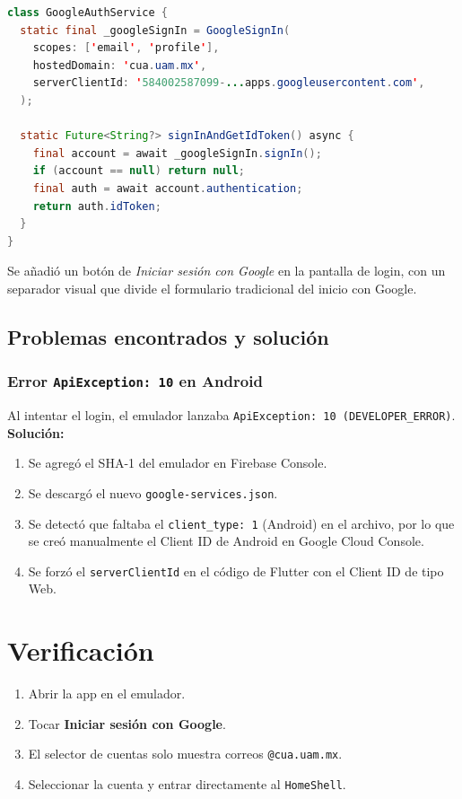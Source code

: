 \begin{lstlisting}[language=Java]
class GoogleAuthService {
  static final _googleSignIn = GoogleSignIn(
    scopes: ['email', 'profile'],
    hostedDomain: 'cua.uam.mx',
    serverClientId: '584002587099-...apps.googleusercontent.com',
  );

  static Future<String?> signInAndGetIdToken() async {
    final account = await _googleSignIn.signIn();
    if (account == null) return null;
    final auth = await account.authentication;
    return auth.idToken;
  }
}
\end{lstlisting}

Se añadió un botón de \textit{Iniciar sesión con Google} en la pantalla de login, con un separador visual que divide el formulario tradicional del inicio con Google.

\subsection{Problemas encontrados y solución}

\subsubsection{Error \texttt{ApiException: 10} en Android}

Al intentar el login, el emulador lanzaba \texttt{ApiException: 10 (DEVELOPER\_ERROR)}. \textbf{Solución:} 
\begin{enumerate}[leftmargin=*]
  \item Se agregó el SHA-1 del emulador en Firebase Console.
  \item Se descargó el nuevo \texttt{google-services.json}.
  \item Se detectó que faltaba el \texttt{client\_type: 1} (Android) en el archivo, por lo que se creó manualmente el Client ID de Android en Google Cloud Console.
  \item Se forzó el \texttt{serverClientId} en el código de Flutter con el Client ID de tipo Web.
\end{enumerate}

\section{Verificación}

\begin{enumerate}[leftmargin=*]
  \item Abrir la app en el emulador.
  \item Tocar \textbf{Iniciar sesión con Google}.
  \item El selector de cuentas solo muestra correos \texttt{@cua.uam.mx}.
  \item Seleccionar la cuenta y entrar directamente al \texttt{HomeShell}.
\end{enumerate}


